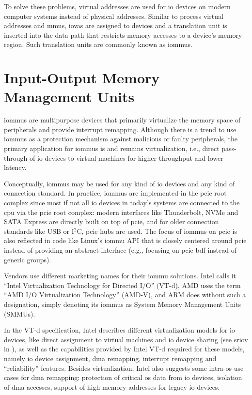 To solve these problems, virtual addresses are used for \ac{io} devices on
modern computer systems instead of physical addresses. Similar to process
virtual addresses and \acp{mmu}, \acp{iova} are assigned to devices and a
translation unit is inserted into the data path that restricts memory accesses
to a device's memory region. Such translation units are commonly known as
\acfp{iommu}.


\section{Input-Output Memory Management Units}
\label{sec:iommus}

\acp{iommu} are multipurpose devices that primarily virtualize the memory space
of peripherals and provide interrupt remapping. Although there is a trend to use
\acp{iommu} as a protection mechanism against malicious or faulty peripherals,
the primary application for \acp{iommu} is and remains virtualization, i.e.,
direct pass-through of \ac{io} devices to virtual machines for higher throughput
and lower latency.

Conceptually, \acp{iommu} may be used for any kind of \ac{io} devices and any
kind of connection standard. In practice, \acp{iommu} are implemented in the
\ac{pcie} root complex since most if not all \ac{io} devices in today's systems
are connected to the \ac{cpu} via the \ac{pcie} root complex: modern interfaces
like Thunderbolt, NVMe and SATA Express are directly built on top of \ac{pcie},
and for older connection standards like USB or I$^2$C, \ac{pcie} hubs are used.
The focus of \acp{iommu} on \ac{pcie} is also reflected in code like Linux's
\ac{iommu} API that is closely centered around \ac{pcie} instead of providing an
abstract interface (e.g., focusing on \ac{pcie} \ac{bdf} instead of generic
groups).

Vendors use different marketing names for their \ac{iommu} solutions. Intel
calls it ``Intel Virtualization Technology for Directed I/O'' (VT-d), AMD uses
the term ``AMD I/O Virtualization Technology'' (AMD-V), and ARM does without
such a designation, simply denoting its \acp{iommu} as System Memory Management
Units (SMMUs).

In the VT-d specification, Intel describes different virtualization models for
\ac{io} devices, like direct assignment to virtual machines and \ac{io} device
sharing (see \ac{sriov} in ), as well as the capabilities
provided by Intel VT-d required for these models, namely \ac{io} device
assignment, \ac{dma} remapping, interrupt remapping and ``reliability''
features. Besides virtualization, Intel also suggests some intra-\ac{os} use
cases for \ac{dma} remapping: protection of critical \ac{os} data from \ac{io}
devices, isolation of \ac{dma} accesses, support of high memory addresses for
legacy \ac{io} devices.

